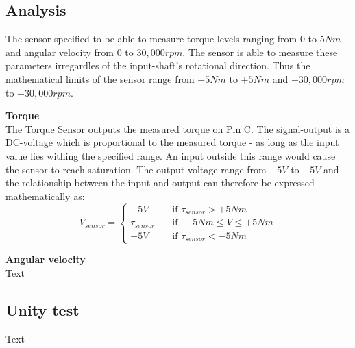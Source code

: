 \subsection{Analysis}
The sensor specified to be able to measure torque levels ranging from $0$ to $5 Nm$ and angular velocity from $0$ to $30,000 rpm$. The sensor is able to measure these parameters irregardles of the input-shaft's rotational direction. Thus the mathematical limits of the sensor range from $-5 Nm$ to $+5 Nm$ and $-30,000 rpm$ to $+30,000 rpm$.

\textbf{Torque}\\
The Torque Sensor outputs the measured torque on Pin C. The signal-output is a DC-voltage which is proportional to the measured torque - as long as the input value lies withing the specified range. An input outside this range would cause the sensor to reach saturation. The output-voltage range from $-5 V$ to $+5 V$ and the relationship between the input and output can therefore be expressed mathematically as:
\begin{equation}
	V_{sensor} = 
	\begin{cases}
		+5V				& \quad \text{if } \tau_{sensor} > +5 Nm\\
		\tau_{sensor}   & \quad \text{if } -5 Nm \leq V \leq +5 Nm\\
		-5V				& \quad \text{if } \tau_{sensor} < -5 Nm
	\end{cases}
\end{equation}

\textbf{Angular velocity}\\
Text

\subsection{Unity test}
Text